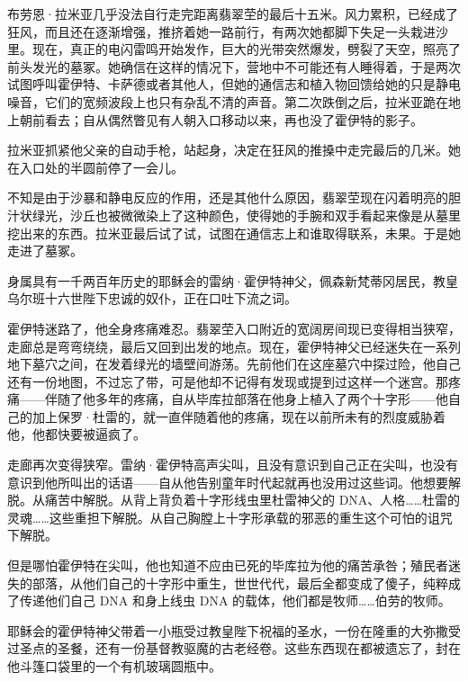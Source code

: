 \documentclass[AutoFakeBold=true]{book}
\begin{document}
\vspace*{1em}

布劳恩·拉米亚几乎没法自行走完距离翡翠茔的最后十五米。风力累积，已经成了狂风，而且还在逐渐增强，推挤着她一路前行，有两次她都脚下失足一头栽进沙里。现在，真正的电闪雷鸣开始发作，巨大的光带突然爆发，劈裂了天空，照亮了前头发光的墓冢。她确信在这样的情况下，营地中不可能还有人睡得着，于是两次试图呼叫霍伊特、卡萨德或者其他人，但她的通信志和植入物回馈给她的只是静电噪音，它们的宽频波段上也只有杂乱不清的声音。第二次跌倒之后，拉米亚跪在地上朝前看去；自从偶然瞥见有人朝入口移动以来，再也没了霍伊特的影子。

拉米亚抓紧他父亲的自动手枪，站起身，决定在狂风的推搡中走完最后的几米。她在入口处的半圆前停了一会儿。

不知是由于沙暴和静电反应的作用，还是其他什么原因，翡翠茔现在闪着明亮的胆汁状绿光，沙丘也被微微染上了这种颜色，使得她的手腕和双手看起来像是从墓里挖出来的东西。拉米亚最后试了试，试图在通信志上和谁取得联系，未果。于是她走进了墓冢。

\vspace*{1em}

身属具有一千两百年历史的耶稣会的雷纳·霍伊特神父，佩森新梵蒂冈居民，教皇乌尔班十六世陛下忠诚的奴仆，正在口吐下流之词。

霍伊特迷路了，他全身疼痛难忍。翡翠茔入口附近的宽阔房间现已变得相当狭窄，走廊总是弯弯绕绕，最后又回到出发的地点。现在，霍伊特神父已经迷失在一系列地下墓穴之间，在发着绿光的墙壁间游荡。先前他们在这座墓穴中探过险，他自己还有一份地图，不过忘了带，可是他却不记得有发现或提到过这样一个迷宫。那疼痛——伴随了他多年的疼痛，自从毕库拉部落在他身上植入了两个十字形——他自己的加上保罗·杜雷的，就一直伴随着他的疼痛，现在以前所未有的烈度威胁着他，他都快要被逼疯了。

走廊再次变得狭窄。雷纳·霍伊特高声尖叫，且没有意识到自己正在尖叫，也没有意识到他所叫出的话语——自从他告别童年时代起就再也没用过这些词。他想要解脱。从痛苦中解脱。从背上背负着十字形线虫里杜雷神父的 DNA、人格……杜雷的{\kaishu 灵魂}……这些重担下解脱。从自己胸膛上十字形承载的邪恶的重生这个可怕的诅咒下解脱。

但是哪怕霍伊特在尖叫，他也知道不应由已死的毕库拉为他的痛苦承咎；殖民者迷失的部落，从他们自己的十字形中重生，世世代代，最后全都变成了傻子，纯粹成了传递他们自己 DNA 和身上线虫 DNA 的载体，他们都是牧师……伯劳的牧师。

耶稣会的霍伊特神父带着一小瓶受过教皇陛下祝福的圣水，一份在隆重的大弥撒受过圣点的圣餐，还有一份基督教驱魔的古老经卷。这些东西现在都被遗忘了，封在他斗篷口袋里的一个有机玻璃圆瓶中。
\end{document}
